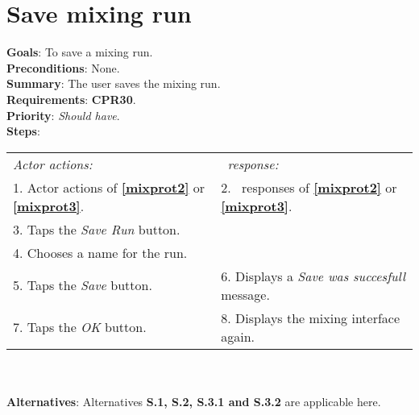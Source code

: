      \section{Save mixing run}
  \label{saverun}
  \textbf{Goals}: To save a mixing run.\\
  \textbf{Preconditions}: None. \\
  \textbf{Summary}: The user saves the mixing run.\\
  \textbf{Requirements}: \textbf{CPR30}.\\
  \textbf{Priority}: \emph{Should have}.\\
  \textbf{Steps}: \\
  \begin{tabular}{ p{} p{} }
  	\emph{Actor actions:} & \emph{\projectname\ response:} \\
  	1. Actor actions of \textbf{\ref{mixprot2}} or \textbf{\ref{mixprot3}}. & 2. \projectname\ responses of \textbf{\ref{mixprot2}} or \textbf{\ref{mixprot3}}. \\
    3. Taps the \emph{Save Run} button.  & \\
    4. Chooses a name for the run. & \\
    5. Taps the \emph{Save} button. & 6. Displays a \emph{Save was succesfull} message.\\
    7. Taps the \emph{OK} button. & 8. Displays the mixing interface again. \\
      \end{tabular}
    	 \\
    \\\textbf{Alternatives}: Alternatives \textbf{S.1, S.2, S.3.1 and S.3.2} are applicable here.

